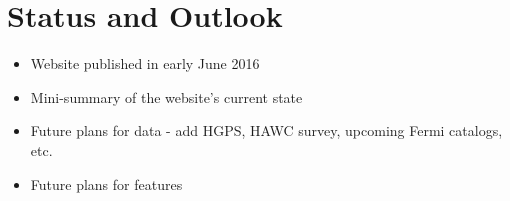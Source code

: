 \section{Status and Outlook}

\begin{itemize}

  \item Website published in early June 2016
  \item Mini-summary of the website's current state
  \item Future plans for data - add HGPS, HAWC survey, upcoming Fermi catalogs, etc.
  \item Future plans for features

\end{itemize}
